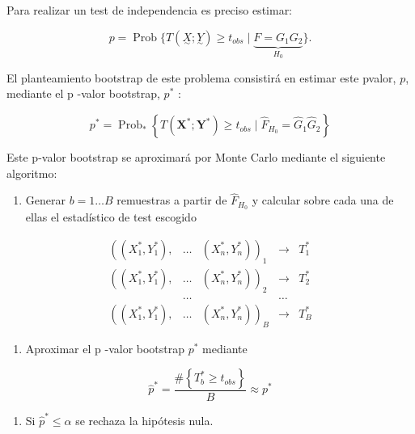 \documentclass[
]{article}
\providecommand{\tightlist}{%
  \setlength{\itemsep}{0pt}\setlength{\parskip}{0pt}}
\begin{document}
Para realizar un test de independencia es preciso estimar:

\[
p=\operatorname{Prob}\{T(\underset{\sim}{X} ; \underset{\sim}{Y}) \geq t_{o b s} \mid \underbrace{F=G_{1} G_{2}}_{H_{0}}\} .
\]

El planteamiento bootstrap de este problema consistirá en estimar este pvalor, \(p\), mediante el p -valor bootstrap, \(p^{*}\) :

\[
p^{*}=\operatorname{Prob}_{*}\left\{T\left(\mathbf{X}^{*} ; \mathbf{Y}^{*}\right) \geq t_{o b s} \mid \widehat{F}_{H_{0}}=\hat{G}_{1} \hat{G}_{2}\right\}
\]

Este p-valor bootstrap se aproximará por Monte Carlo mediante el siguiente algoritmo:

\begin{enumerate}
\def\labelenumi{\arabic{enumi}.}
\tightlist
\item
  Generar \(b=1 \ldots B\) remuestras a partir de \(\widehat{F}_{H_{0}}\) y calcular sobre cada una de ellas el estadístico de test escogido
\end{enumerate}

\[
\begin{array}{lllll}
\left(\left(X_{1}^{*}, Y_{1}^{*}\right),\right. & \ldots & \left.\left(X_{n}^{*}, Y_{n}^{*}\right)\right)_{1} & \rightarrow & T_{1}^{*} \\
\left(\left(X_{1}^{*}, Y_{1}^{*}\right),\right. & \ldots & \left.\left(X_{n}^{*}, Y_{n}^{*}\right)\right)_{2} & \rightarrow & T_{2}^{*} \\
& \ldots & & \ldots & \\
\left(\left(X_{1}^{*}, Y_{1}^{*}\right),\right. & \ldots & \left.\left(X_{n}^{*}, Y_{n}^{*}\right)\right)_{B} & \rightarrow & T_{B}^{*}
\end{array}
\]

\begin{enumerate}
\def\labelenumi{\arabic{enumi}.}
\setcounter{enumi}{1}
\tightlist
\item
  Aproximar el p -valor bootstrap \(p^{*}\) mediante
\end{enumerate}

\[
\hat{p}^{*}=\frac{\#\left\{T_{b}^{*} \geq t_{o b s}\right\}}{B} \approx p^{*}
\]

\begin{enumerate}
\def\labelenumi{\arabic{enumi}.}
\setcounter{enumi}{2}
\tightlist
\item
  Si \(\hat{p}^{*} \leq \alpha\) se rechaza la hipótesis nula.
\end{enumerate}
\end{document}
